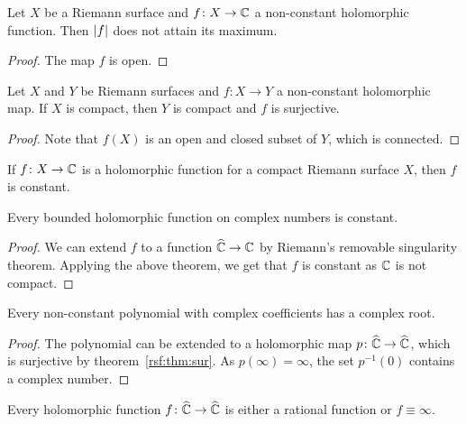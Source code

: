 \begin{posledica}
Let $X$ be a Riemann surface and $f \colon X \to \mathbb{C}$ a non-constant
holomorphic function. Then $\left\lvert f\right\rvert$ does not attain its maximum.
\end{posledica}

\begin{proof}
The map $f$ is open.
\end{proof}

\begin{izrek}
\label{rsf:thm:sur}
Let $X$ and $Y$ be Riemann surfaces and $f \colon X \to Y$ a
non-constant holomorphic map. If $X$ is compact, then $Y$ is
compact and $f$ is surjective.
\end{izrek}

\begin{proof}
Note that $f(X)$ is an open and closed subset of $Y$, which is
connected.
\end{proof}

\begin{posledica}
If $f \colon X \to \mathbb{C}$ is a holomorphic function for a compact
Riemann surface $X$, then $f$ is constant.
\end{posledica}

\obvs

\begin{izrek}[Liouville]
Every bounded holomorphic function on complex numbers is constant.
\end{izrek}

\begin{proof}
We can extend $f$ to a function $\widehat{\mathbb{C}} \to \mathbb{C}$ by Riemann's removable
singularity theorem. Applying the above theorem, we get that $f$ is
constant as $\mathbb{C}$ is not compact.
\end{proof}

\begin{izrek}
Every non-constant polynomial with complex coefficients has a
complex root.
\end{izrek}

\begin{proof}
The polynomial can be extended to a holomorphic map
$p \colon \widehat{\mathbb{C}} \to \widehat{\mathbb{C}}$, which is surjective by
theorem~\ref{rsf:thm:sur}. As $p(\infty) = \infty$, the set
$p^{-1}(0)$ contains a complex number.
\end{proof}

\begin{izrek}
Every holomorphic function $f \colon \widehat{\mathbb{C}} \to \widehat{\mathbb{C}}$ is either a
rational function or $f \equiv \infty$.
\end{izrek}

